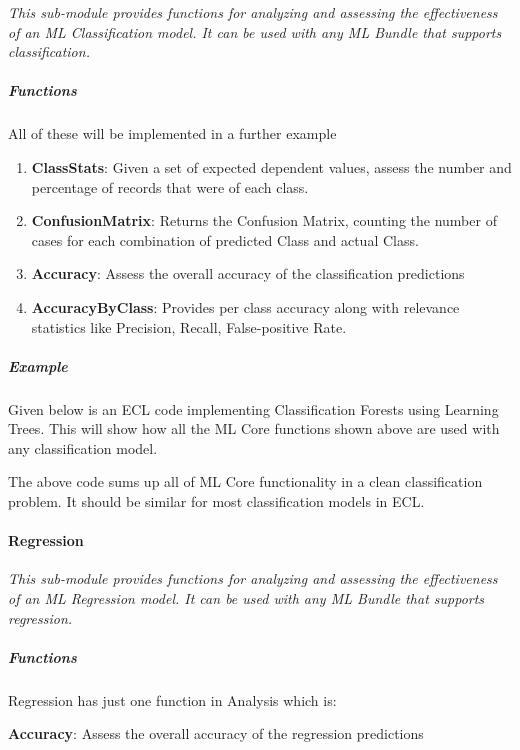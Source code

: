 \textit{This sub-module provides functions for analyzing and assessing the effectiveness of an ML Classification model. It can be used with any ML Bundle that supports classification.}

\subparagraph{Functions}

All of these will be implemented in a further example

\begin{enumerate}
    \item \textbf{ClassStats}: Given a set of expected dependent values, assess the number and percentage of records that were of each class.
    \item \textbf{ConfusionMatrix}: Returns the Confusion Matrix, counting the number of cases for each combination of predicted Class and actual Class.
    \item \textbf{Accuracy}: Assess the overall accuracy of the classification predictions
    \item \textbf{AccuracyByClass}: Provides per class accuracy along with relevance statistics like Precision, Recall, False-positive Rate.
\end{enumerate}

\subparagraph{Example}\label{classification:example}

Given below is an ECL code implementing Classification Forests using Learning Trees. This will show how all the ML Core functions shown above are used with any classification model.



The above code sums up all of ML Core functionality in a clean classification problem. It should be similar for most classification models in ECL.

\paragraph{Regression}\label{analysis:regression}

\textit{This sub-module provides functions for analyzing and assessing the effectiveness of an ML Regression model. It can be used with any ML Bundle that supports regression.}

\subparagraph{Functions}

Regression has just one function in Analysis which is:

\textbf{Accuracy}: Assess the overall accuracy of the regression predictions

